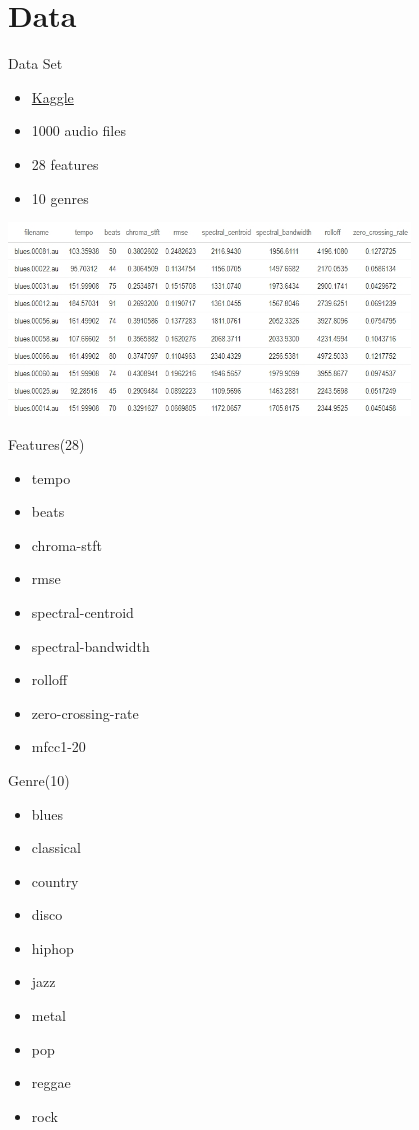 \documentclass[11pt]{beamer}
\begin{document}
\section{Data}
\begin{frame}{Data Set}
\begin{itemize}
    \item \href{https://www.kaggle.com/datasets/insiyeah/musicfeatures}{Kaggle}
    \item 1000 audio files
    \item 28 features
    \item 10 genres
\end{itemize}
\begin{center}
    \includegraphics[width=0.8\textwidth]{data.jpg}
\end{center}
\end{frame}

\begin{frame}{Features(28)}
\begin{itemize}
  \item tempo
  \item beats
  \item chroma-stft
  \item rmse
  \item spectral-centroid
  \item spectral-bandwidth
  \item rolloff
  \item zero-crossing-rate
  \item mfcc1-20
\end{itemize}
\end{frame}

\begin{frame}{Genre(10)}
\begin{itemize}
  \item blues
  \item classical
  \item country
  \item disco
  \item hiphop
  \item jazz
  \item metal
  \item pop
  \item reggae
  \item rock
\end{itemize}
\end{frame}
\end{document}
